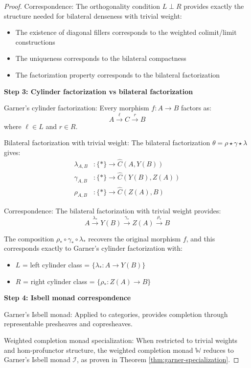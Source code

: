 \documentclass[11pt]{article}
\theoremstyle{plain}
\theoremstyle{definition}
\theoremstyle{remark}
\newcommand{\wh}[1]{\widehat{#1}}
\begin{document}
\begin{proof}
Correspondence: The orthogonality condition $L \perp R$ provides exactly the structure needed for bilateral denseness with trivial weight:
\begin{itemize}
\item The existence of diagonal fillers corresponds to the weighted colimit/limit constructions
\item The uniqueness corresponds to the bilateral compactness
\item The factorization property corresponds to the bilateral factorization
\end{itemize}

\textbf{Step 3: Cylinder factorization vs bilateral factorization}

Garner's cylinder factorization: Every morphism $f : A \to B$ factors as:
$$A \xrightarrow{\ell} C \xrightarrow{r} B$$
where $\ell \in L$ and $r \in R$.

Bilateral factorization with trivial weight: The bilateral factorization $\theta = \rho \star \gamma \star \lambda$ gives:
\begin{align}
\lambda_{A,B} &: \{*\} \to \wh{C}(A, Y(B)) \\
\gamma_{A,B} &: \{*\} \to \wh{C}(Y(B), Z(A)) \\
\rho_{A,B} &: \{*\} \to \wh{C}(Z(A), B)
\end{align}

Correspondence: The bilateral factorization with trivial weight provides:
$$A \xrightarrow{\lambda_*} Y(B) \xrightarrow{\gamma_*} Z(A) \xrightarrow{\rho_*} B$$

The composition $\rho_* \circ \gamma_* \circ \lambda_*$ recovers the original morphism $f$, and this corresponds exactly to Garner's cylinder factorization with:
\begin{itemize}
\item $L$ = left cylinder class = $\{\lambda_* : A \to Y(B)\}$
\item $R$ = right cylinder class = $\{\rho_* : Z(A) \to B\}$
\end{itemize}

\textbf{Step 4: Isbell monad correspondence}

Garner's Isbell monad: Applied to categories, provides completion through representable presheaves and copresheaves.

Weighted completion monad specialization: When restricted to trivial weights and hom-profunctor structure, the weighted completion monad $\mathbb{W}$ reduces to Garner's Isbell monad $\mathcal{I}$, as proven in Theorem \ref{thm:garner-specialization}.


\end{proof}
\end{document}

